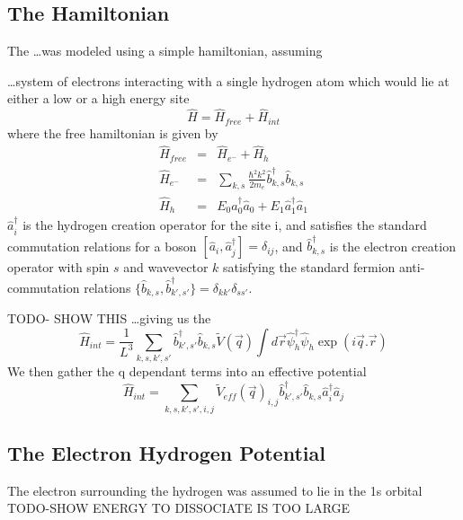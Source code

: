 \subsection{The Hamiltonian}
The \ldots was modeled using a simple
hamiltonian, assuming

\ldots system of electrons interacting with
a single hydrogen atom which would lie at
either a low or a high energy site
\begin{equation}
    \hat{H} = \hat{H}_{free} + \hat{H}_{int}
\end{equation}
where the free hamiltonian is given by
\begin{eqnarray}
    \hat{H}_{free} &=& \hat{H}_{e^-} + \hat{H}_{h}\\
    \hat{H}_{e^-} &=& \sum_{k, s}
    \frac{\hbar^2 k^2}{2m_e} \hat{b}^\dagger_{k, s} \hat{b}_{k, s}\\
    \hat{H}_{h} &=&
    E_0 \hat{a}^\dagger_0 \hat{a}_0
    + E_1 \hat{a}^\dagger_1 \hat{a}_1
\end{eqnarray}
\(\hat{a}^\dagger_i\) is the hydrogen creation
operator for the site i, and satisfies the standard commutation
relations for a boson \(\left[ \hat{a}_i, \hat{a}^\dagger_j \right] = \delta_{ij}\),
and \(\hat{b}^\dagger_{k, s}\) is the electron creation operator
with spin \(s\) and wavevector \(k\) satisfying the standard
fermion anti-commutation relations
\( \{ \hat{b}_{k, s}, \hat{b}^\dagger_{k', s'} \} = \delta_{k k'} \delta_{s s'}\).

TODO- SHOW THIS
\ldots giving us the
\begin{equation}
    \hat{H}_{int} = \frac{1}{L^3}\sum_{k,s,k',s'}\hat{b}^\dagger_{k',s'}\hat{b}_{k,s}\tilde{V}(\vec{q})\int{d\vec{r}
    \hat{\psi}_h^{\dagger}\hat{\psi}_h \exp(i\vec{q}.\vec{r})}
\end{equation}
We then gather the q dependant terms into
an effective potential
\begin{equation}
    \hat{H}_{int} = \sum_{k,s,k',s',i,j}
    {\tilde{V}_{eff}(\vec{q})}_{i,j}
    \hat{b}^\dagger_{k',s'}\hat{b}_{k,s}
    \hat{a}^\dagger_{i}\hat{a}_{j}
    \label{eqn:interaction hamiltonian in k}
\end{equation}

\subsection{The Electron Hydrogen Potential}

The electron surrounding the hydrogen was assumed
to lie in the 1s orbital
TODO-SHOW ENERGY TO DISSOCIATE IS TOO LARGE

